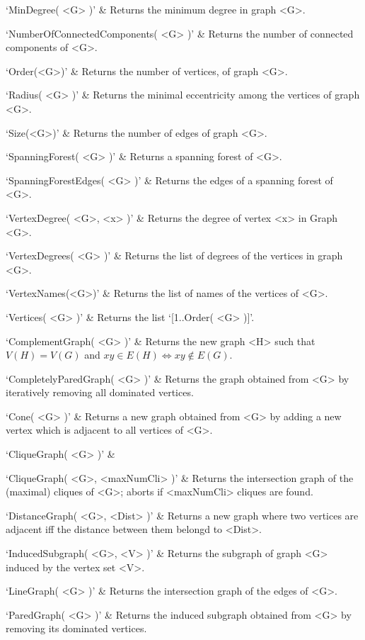 `MinDegree( <G> )' & 
Returns the minimum degree in graph <G>.

`NumberOfConnectedComponents( <G> )' & 
Returns the number of connected components of <G>.

`Order(<G>)' & 
Returns the number of vertices, of graph <G>.

`Radius( <G> )' & 
Returns the minimal eccentricity among the vertices of graph <G>.

`Size(<G>)' & 
Returns the number of edges of graph <G>.

`SpanningForest( <G> )' & 
Returns a spanning forest of <G>.

`SpanningForestEdges( <G> )' & 
Returns the edges of a spanning forest of <G>.

`VertexDegree( <G>, <x> )' & 
Returns the degree of vertex <x> in Graph <G>.

`VertexDegrees( <G> )' & 
Returns the list of degrees of the vertices in graph <G>.

`VertexNames(<G>)' & 
Returns  the  list of names of the vertices of <G>.

`Vertices( <G> )' & 
Returns the list `[1..Order( <G> )]'.
\enditems


\beginitems
`ComplementGraph( <G> )' & 
Returns the new graph <H> such that  $V(H)=V(G)$ and $xy\in E(H) \iff xy \not\in E(G)$.

`CompletelyParedGraph( <G> )' & 
Returns the graph obtained from <G> by iteratively removing all dominated vertices. 

`Cone( <G> )' & 
Returns a new graph obtained from <G> by adding a new vertex which is adjacent to all vertices of <G>.

`CliqueGraph( <G> )' &

`CliqueGraph( <G>, <maxNumCli> )' & 
Returns the intersection graph of the (maximal) cliques of <G>; aborts if <maxNumCli> cliques are found.

`DistanceGraph( <G>, <Dist> )' & 
Returns a new graph where two vertices are adjacent iff the distance between them belongd to <Dist>.

`InducedSubgraph( <G>, <V> )' & 
Returns the subgraph of graph <G> induced by the vertex set <V>.

`LineGraph( <G> )' & 
Returns the intersection graph of the edges of <G>.

`ParedGraph( <G> )' & 
Returns the induced subgraph obtained from   <G>  by  removing  its  dominated  vertices.

